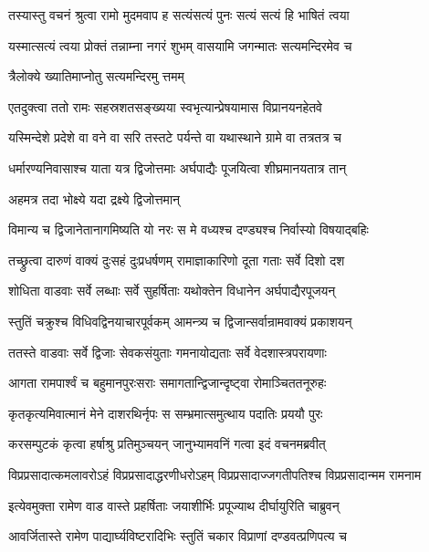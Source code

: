 \twolineshloka
{तस्यास्तु वचनं श्रुत्वा रामो मुदमवाप ह}
{सत्यंसत्यं पुनः सत्यं सत्यं हि भाषितं त्वया}%

\twolineshloka
{यस्मात्सत्यं त्वया प्रोक्तं तन्नाम्ना नगरं शुभम्}
{वासयामि जगन्मातः सत्यमन्दिरमेव च}%

\onelineshloka
{त्रैलोक्ये ख्यातिमाप्नोतु सत्यमन्दिरमु त्तमम्}%

\twolineshloka
{एतदुक्त्वा ततो रामः सहस्रशतसङ्ख्यया}
{स्वभृत्यान्प्रेषयामास विप्रानयनहेतवे}%

\twolineshloka
{यस्मिन्देशे प्रदेशे वा वने वा सरि तस्तटे}
{पर्यन्ते वा यथास्थाने ग्रामे वा तत्रतत्र च}%

\twolineshloka
{धर्मारण्यनिवासाश्च याता यत्र द्विजोत्तमाः}
{अर्घपाद्यैः पूजयित्वा शीघ्रमानयतात्र तान्}%

\onelineshloka
{अहमत्र तदा भोक्ष्ये यदा द्रक्ष्ये द्विजोत्तमान्}%

\twolineshloka
{विमान्य च द्विजानेतानागमिष्यति यो नरः}
{स मे वध्यश्च दण्ड्यश्च निर्वास्यो विषयाद्बहिः}%

\twolineshloka
{तच्छ्रुत्वा दारुणं वाक्यं दुःसहं दुःप्रधर्षणम्}
{रामाज्ञाकारिणो दूता गताः सर्वे दिशो दश}%

\twolineshloka
{शोधिता वाडवाः सर्वे लब्धाः सर्वे सुहर्षिताः}
{यथोक्तेन विधानेन अर्घपाद्यैरपूजयन्}%

\twolineshloka
{स्तुतिं चक्रुश्च विधिवद्विनयाचारपूर्वकम्}
{आमन्त्र्य च द्विजान्सर्वान्रामवाक्यं प्रकाशयन्}%

\twolineshloka
{ततस्ते वाडवाः सर्वे द्विजाः सेवकसंयुताः}
{गमनायोद्यताः सर्वे वेदशास्त्रपरायणाः}%

\twolineshloka
{आगता रामपार्श्वं च बहुमानपुरःसराः}
{समागतान्द्विजान्दृष्ट्वा रोमाञ्चिततनूरुहः}%

\twolineshloka
{कृतकृत्यमिवात्मानं मेने दाशरथिर्नृपः}
{स सम्भ्रमात्समुत्थाय पदातिः प्रययौ पुरः}%

\twolineshloka
{करसम्पुटकं कृत्वा हर्षाश्रु प्रतिमुञ्चयन्}
{जानुभ्यामवनिं गत्वा इदं वचनमब्रवीत्}%

\twolineshloka
{विप्रप्रसादात्कमलावरोऽहं विप्रप्रसादाद्धरणीधरोऽहम्}
{विप्रप्रसादाज्जगतीपतिश्च विप्रप्रसादान्मम रामनाम}%

\twolineshloka
{इत्येवमुक्ता रामेण वाड वास्ते प्रहर्षिताः}
{जयाशीर्भिः प्रपूज्याथ दीर्घायुरिति चाब्रुवन्}%

\twolineshloka
{आवर्जितास्ते रामेण पाद्यार्घ्यविष्टरादिभिः}
{स्तुतिं चकार विप्राणां दण्डवत्प्रणिपत्य च}%

